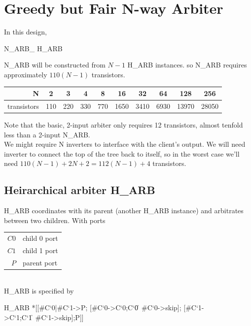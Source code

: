 \documentclass[aer.tex]{subfiles}
\begin{document}
\section{Greedy but Fair N-way Arbiter}

In this design, 

\begin{csp}
N\_ARB\_ \equiv H\_ARB
\end{csp}

N\_ARB will be constructed from $N-1$ H\_ARB instances. so N\_ARB requires approximately $110(N-1)$ transistors.

\begin{center}
  \begin{tabular}{|r|c|c|c|c|c|c|c|c|c|}
    \hline
    N & 2 & 3 & 4 & 8 & 16 & 32 & 64 & 128 & 256 \\
    \hline
    transistors & 110 & 220 & 330 & 770 & 1650 & 3410 & 6930 & 13970 & 28050 \\
    \hline
  \end{tabular}
\end{center}

Note that the basic, 2-input arbiter only requires 12 transistors, almost tenfold less than a 2-input N\_ARB. \\
We might require N inverters to interface with the client's output. 
We will need inverter to connect the top of the tree back to itself, 
so in the worst case we'll need $110(N-1)+2N+2=112(N-1)+4$ transistors.

\subsection{Heirarchical arbiter H\_ARB}

H\_ARB coordinates with its parent (another H\_ARB instance) and arbitrates between two children. 
With ports

\begin{tabular}[]{rl}
$C0$ & child 0 port \\
$C1$ & child 1 port \\
$P$ & parent port \\
\end{tabular} \\

\noindent H\_ARB is specified by

\begin{csp}
H_ARB\equiv
  *[[#{C`0}|#{C`1}->P;
    [#{C`0}->C`0;C`0\|~#{C`0}->skip];
    [#{C`1}->C`1;C`1\|~#{C`1}->skip];P]]
\end{csp}
\end{document}
